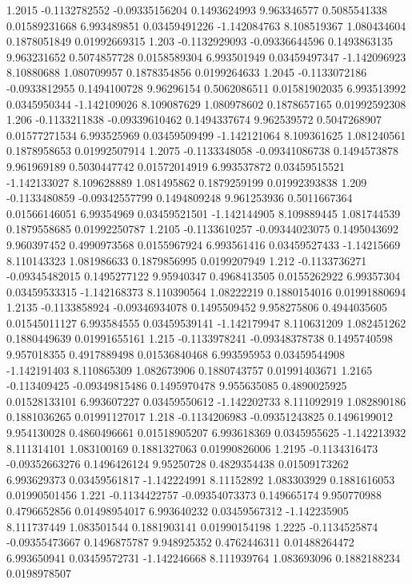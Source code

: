 {1.2015 -0.1132782552 -0.09335156204 0.1493624993 9.963346577 0.5085541338 0.01589231668 6.993489851 0.03459491226 -1.142084763 8.108519367 1.080434604 0.1878051849 0.01992669315
1.203 -0.1132929093 -0.09336644596 0.1493863135 9.963231652 0.5074857728 0.0158589304 6.993501949 0.03459497347 -1.142096923 8.10880688 1.080709957 0.1878354856 0.0199264633
1.2045 -0.1133072186 -0.0933812955 0.1494100728 9.96296154 0.5062086511 0.01581902035 6.993513992 0.0345950344 -1.142109026 8.109087629 1.080978602 0.1878657165 0.01992592308
1.206 -0.1133211838 -0.09339610462 0.1494337674 9.962539572 0.5047268907 0.01577271534 6.993525969 0.03459509499 -1.142121064 8.109361625 1.081240561 0.1878958653 0.01992507914
1.2075 -0.1133348058 -0.09341086738 0.1494573878 9.961969189 0.5030447742 0.01572014919 6.993537872 0.03459515521 -1.142133027 8.109628889 1.081495862 0.1879259199 0.01992393838
1.209 -0.1133480859 -0.09342557799 0.1494809248 9.961253936 0.5011667364 0.01566146051 6.99354969 0.03459521501 -1.142144905 8.109889445 1.081744539 0.1879558685 0.01992250787
1.2105 -0.1133610257 -0.09344023075 0.1495043692 9.960397452 0.4990973568 0.0155967924 6.993561416 0.03459527433 -1.14215669 8.110143323 1.081986633 0.1879856995 0.0199207949
1.212 -0.1133736271 -0.09345482015 0.1495277122 9.95940347 0.4968413505 0.0155262922 6.99357304 0.03459533315 -1.142168373 8.110390564 1.08222219 0.1880154016 0.01991880694
1.2135 -0.1133858924 -0.09346934078 0.1495509452 9.958275806 0.4944035605 0.01545011127 6.993584555 0.03459539141 -1.142179947 8.110631209 1.082451262 0.1880449639 0.01991655161
1.215 -0.1133978241 -0.09348378738 0.1495740598 9.957018355 0.4917889498 0.01536840468 6.993595953 0.03459544908 -1.142191403 8.110865309 1.082673906 0.1880743757 0.01991403671
1.2165 -0.113409425 -0.09349815486 0.1495970478 9.955635085 0.4890025925 0.01528133101 6.993607227 0.03459550612 -1.142202733 8.111092919 1.082890186 0.1881036265 0.01991127017
1.218 -0.1134206983 -0.09351243825 0.1496199012 9.954130028 0.4860496661 0.01518905207 6.993618369 0.0345955625 -1.142213932 8.111314101 1.083100169 0.1881327063 0.01990826006
1.2195 -0.1134316473 -0.09352663276 0.1496426124 9.95250728 0.4829354438 0.01509173262 6.993629373 0.03459561817 -1.142224991 8.11152892 1.083303929 0.1881616053 0.01990501456
1.221 -0.1134422757 -0.09354073373 0.149665174 9.950770988 0.4796652856 0.01498954017 6.993640232 0.03459567312 -1.142235905 8.111737449 1.083501544 0.1881903141 0.01990154198
1.2225 -0.1134525874 -0.09355473667 0.1496875787 9.948925352 0.4762446311 0.01488264472 6.993650941 0.03459572731 -1.142246668 8.111939764 1.083693096 0.1882188234 0.0198978507
}
